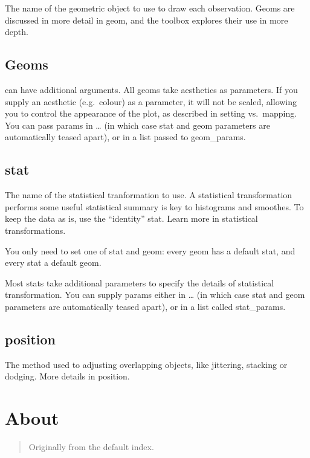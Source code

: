 \documentclass[
]{book}
\theoremstyle{definition}
\theoremstyle{definition}
\theoremstyle{definition}
\theoremstyle{definition}
\theoremstyle{remark}
\begin{document}
The name of the geometric object to use to draw each observation. Geoms are discussed in more detail in geom, and the toolbox explores their use in more depth.

\hypertarget{geoms-1}{%
\section{Geoms}\label{geoms-1}}

can have additional arguments. All geoms take aesthetics as parameters. If you supply an aesthetic (e.g.~colour) as a parameter, it will not be scaled, allowing you to control the appearance of the plot, as described in setting vs.~mapping. You can pass params in \ldots{} (in which case stat and geom parameters are automatically teased apart), or in a list passed to geom\_params.

\hypertarget{stat}{%
\section{stat}\label{stat}}

The name of the statistical tranformation to use. A statistical transformation performs some useful statistical summary is key to histograms and smoothes. To keep the data as is, use the ``identity'' stat. Learn more in statistical transformations.

You only need to set one of stat and geom: every geom has a default stat, and every stat a default geom.

Most stats take additional parameters to specify the details of statistical transformation. You can supply params either in \ldots{} (in which case stat and geom parameters are automatically teased apart), or in a list called stat\_params.

\hypertarget{position}{%
\section{position}\label{position}}

The method used to adjusting overlapping objects, like jittering, stacking or dodging. More details in position.

\hypertarget{about}{%
\chapter{About}\label{about}}

\begin{quote}
Originally from the default index.
\end{quote}
\end{document}
